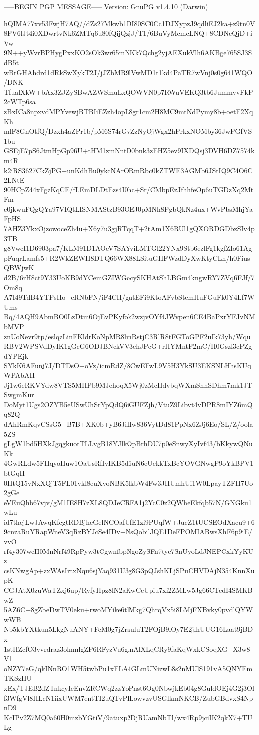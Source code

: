 -----BEGIN PGP MESSAGE-----
Version: GnuPG v1.4.10 (Darwin)

hQIMA77xv53FwjH7AQ//dZs27Mkwb1DI80SC0Cc1DJXypzJ9qdliEJ2ka+z9tn0V
8FV6lJt4i0XDwrtvNk6ZMTq6u80fQijQzjJ/T1/6BuVyMcmcLNQ+8CDNcQjD+iVw
9N++yWvrBPHygPxxKO2sOk3wr65mNKk7Qchg2yjAEXukVlh6AKBge765SJ3SdB5t
wBrGHAhdrd1dRkSwXykT2J/jJZbMR9lVwMD1t1kd4PaTR7wVnj0s0g641WQO/DNK
TfualXkW+bAx3ZJZySBwAZWSmuLxQOWVN0p7RWuVEKQ3tb6JummvvFkP2cWTp6sa
zBxICa8npxvdMPYvewjBTBIiEZzh4opL8gr1cm2H8MC9mtNdPymy8b+oetF2XqKh
mlF8GnOtfQ/Dzxh4aZPr1b/pM6S74rGvZzNyOjWgx2hPrkxNOMby36JwPGfVS1bu
GSEjE7pS6JtmHpGp96U+tHM1zmNntD0bnk3zEHZ5ev9IXDQsj3DVH6DZ7574km4R
k2iRS3627CkZjPG+unKdhBu0ykcNArORmRbc0kZTWE3AGMb6JStIQ9C4O6C2LNtE
90HCpZ44xFgzKqCE/fLEmDLDtEzs4I0hc+Sr/CMbpEzJfhhfeOp6uTGDzXq2MtFm
c0jkwuFQgQYa97VIQtLISNMAStzB93OEJ0pMNh8PgbQkNz4ux+WvPbsMhjYaFpHS
7AHZ3YkxOjzowoceZh4u+X6y7u3gjRTqqT+2tAm1X6RUl1gQXORDGDbzSIv4p3TB
g8VwcI1D6903pa7/KLM91D1AOeV7SAYviLMTGl22YNx9Stb6ezlFg1kgfZIo61Ag
pFuqrLamfs5+R2WkZEWH8DTQ66WX88LSituGHFWzdDyXwKtyCLn/h0FiusQBWjwK
d2B/6rH8ct9Y33UoKB9dYCemGZIWGocySKHAtShLBGm4kngwRY7ZVq6FJf/7Om8q
A7I49TdB4YTPsHo+cRNbFN/iF4CH/gutEFi9KtoAFvbStemHuFGuFk0Y4Lf7WUms
Bq/4AQH9AbmBO0LzDtm6OjEvPKyfok2wzjvOYf4JWvpen6CE4BaPxrYFJvNMbMVP
znUoNevr9tp/eslqzLinFKldrKoNpMR8lmRstjC3RlR8tFGToGPF2uIk73yh/Wqu
RBV2WPSVdDyIK1gGcG6ODJBNckVV3ehJPcG+rHYMntF2mC/H0Gszl3cPZgdYPEjk
SYkK6AFunj7J/DTDsO+oVz/icmRdZ/8CwEFwL9V5H3YkSU3EKSNLHhsKUqWPAbAH
Jj1w6eRKVYdw8VTS5MHPb9MJehoqX5Wj0zMcHdvbqWXmShnSDhm7mk1JTSwgmKur
DoMyt1Ugs2OZYB5eUSwUhSrYpQdQ6iGUFZjh/VtuZ9Libvt4vDPR8mIYZ6mQq82Q
dAhRmKqvCSsG5+B7B+XK0b+yB6JiHw836VytDd81PpNx6ZJj6Eo/SL/Z/oola5ZS
gLgW1bd5HXkJgqgkuotTLLvgB18YJlkOpBrhDU7p0eSnwyXyIvf43/bKkywQNuKk
4GwRLdw5FHqyoHuw1OaUsRfIvIKB5d6uN6eUekkTxBcYOVGNwgP9oYkBPV1btGqH
0HtQ15vNxXQjT5FL01vkl8euXvoNBK5lkbW4Fw3JHUmhUi1W0LpayTZFH7Uo2gGe
eVEuQhb67vjv/gM1IE8H7zXL8QDJeCRFA1j2YcC0z2QWheEkfqb57N/GNGku1wLu
id7thejLwJAwqKfcgtRDBjheGelNCOafUfE1zi9PUqfW+JucZ1tUCSEOdXacu9+6
9cnzaRuYRapWneV3qRzBYJcSe4IDv+NsQobilJQE1DeFPOMIABwsXhF6p9iE/vvO
rf4y307wcH0MnNrf49RpPyw3tCgwnfbpNgoZySFn7tyc7SnUyoLdJNEPCxkYyKUz
csKNwgAp+zxWAsIrtxNqu6sjYaq931U3g8G3pQJshKLjSPuCHVDAjN354KnnXupK
CGJAtX0zuWaTZxj6up/RyfyHpz8lN2aKwCcUpiu7xi2ZMLw5Jg66CTcdI4SMKBwZ
5AZ6C+8gZbeDwTV0eku+rwoMYike6tlMkg7QhrqVx5i8LMjFXBvky0pvdlQYWwWB
Nb5kbYXtkun5LkgNuANY+FcM0g7jZrauluT2FOjB9lOy7E2jlhUUG16Laat9jBDx
1stHZcfO3vvrdraz3olnmlgZP6RFyzVu6gmAlXLqCRy9faKqWxkCSoqXG+X3w8V1
oNZY7eG/qkINnRO1WH5twbPu1xFLA4GLmUNizwL8s2nMUlS191vA5QNYEmTKSzHU
xEx/TJEB2dZTnkcyIeEnvZRCWq2zzYoPnst6Og0NbwjkEb04g8GuldOEj4G2j3Ol
f3WfgVl8HLcN1iixUWM7entTI2uQTvPILowvzvUSGlkmNKCB/ZubGBdvxS4NpnD9
KcIPv2Z7MQ0a60H0mzbYGtiV/9atuxp2DjRUamNbTl/wx4Rp9jciIK2qkX7+TULg
